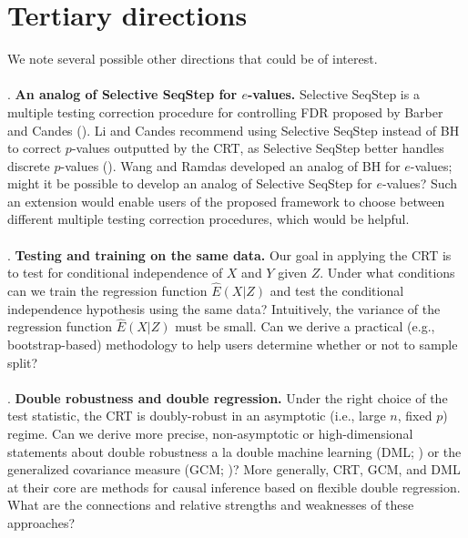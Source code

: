 \documentclass[12pt]{article}
\begin{document}
\section*{Tertiary directions}
We note several possible other directions that could be of interest.
\\ \\ . \textbf{An analog of Selective SeqStep for $e$-values.}  Selective SeqStep is a multiple testing correction procedure for controlling FDR proposed by Barber and Candes (\cite{Barber2015}). Li and Candes recommend using Selective SeqStep instead of BH to correct $p$-values outputted by the CRT, as Selective SeqStep better handles discrete $p$-values (\cite{Li2021}). Wang and Ramdas developed an analog of BH for $e$-values; might it be possible to develop an analog of Selective SeqStep for $e$-values? Such an extension would enable users of the proposed framework to choose between different multiple testing correction procedures, which would be helpful.
\\ \\ . \textbf{Testing and training on the same data.} Our goal in applying the CRT is to test for conditional independence of $X$ and $Y$ given $Z$. Under what conditions can we train the regression function $\hat{E}(X|Z)$ and test the conditional independence hypothesis using the same data? Intuitively, the variance of the regression function $\hat{E}(X|Z)$ must be small. Can we derive a practical (e.g., bootstrap-based) methodology to help users determine whether or not to sample split?
\\ \\ . \textbf{Double robustness and double regression.} Under the right choice of the test statistic, the CRT is doubly-robust in an asymptotic (i.e., large $n$, fixed $p$) regime. Can we derive more precise, non-asymptotic or high-dimensional statements about double robustness a la double machine learning (DML; \cite{Chernozhukov2018}) or the generalized covariance measure (GCM; \cite{Shah2020})? More generally, CRT, GCM, and DML at their core are methods for causal inference based on flexible double regression. What are the connections and relative strengths and weaknesses of these approaches?
\\ \\ \noindent
\end{document}
